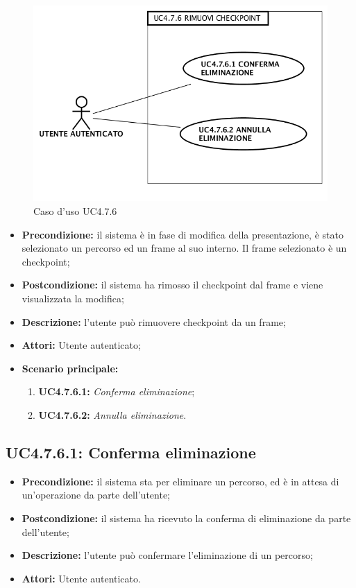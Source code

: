\begin{figure}[h]
	\begin{center}
	\includegraphics[scale=0.4]{diagram/UC4-7-6.png}
	\caption{Caso d'uso UC4.7.6}
	\end{center}
\end{figure}
\begin{itemize}
	\item \textbf{Precondizione:} il sistema è in fase di modifica della presentazione, è stato selezionato un percorso ed un frame al suo interno. Il frame selezionato è un checkpoint;
	\item \textbf{Postcondizione:} il sistema ha rimosso il checkpoint dal frame e viene visualizzata la modifica;
	\item \textbf{Descrizione:} l'utente può rimuovere checkpoint da un frame;
	\item \textbf{Attori:} Utente autenticato;
	\item \textbf{Scenario principale:}
	\begin{enumerate}
		\item \textbf{ UC4.7.6.1:} \textit{ Conferma eliminazione};
		\item \textbf{ UC4.7.6.2:} \textit{ Annulla eliminazione}.
	\end{enumerate}
\end{itemize}
\subsection{ UC4.7.6.1: Conferma eliminazione}

\begin{itemize}
	\item \textbf{Precondizione:} il sistema sta per eliminare un percorso, ed è in attesa di un'operazione da parte dell'utente;
	\item \textbf{Postcondizione:} il sistema ha ricevuto la conferma di eliminazione da parte dell'utente;
	\item \textbf{Descrizione:} l'utente può confermare l'eliminazione di un percorso;
	\item \textbf{Attori:} Utente autenticato.
\end{itemize}
